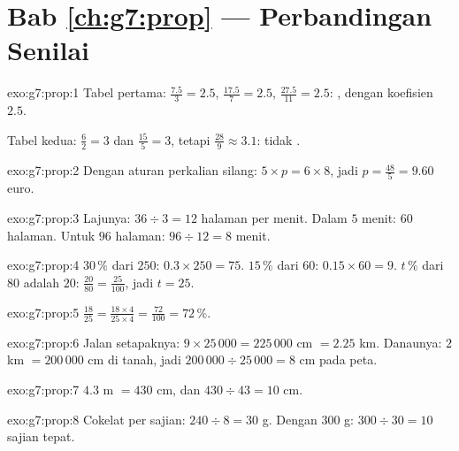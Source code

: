 \section*{Bab \ref{ch:g7:prop} --- Perbandingan Senilai}

\begin{solution}{exo:g7:prop:1}
Tabel pertama:  $\frac{7.5}{3} = 2.5$,
$\frac{17.5}{7} = 2.5$, $\frac{27.5}{11} = 2.5$: , dengan
koefisien $2.5$.

Tabel kedua: $\frac62 = 3$ dan $\frac{15}{5} = 3$, tetapi
$\frac{28}{9} \approx 3.1$: tidak .
\end{solution}

\begin{solution}{exo:g7:prop:2}
Dengan aturan perkalian silang: $5 \times p = 6 \times 8$, jadi
$p = \frac{48}{5} = 9.60$ euro.
\end{solution}

\begin{solution}{exo:g7:prop:3}
Lajunya: $36 \div 3 = 12$ halaman per menit. Dalam $5$ menit:
$60$ halaman. Untuk $96$ halaman: $96 \div 12 = 8$ menit.
\end{solution}

\begin{solution}{exo:g7:prop:4}
$30\,\%$ dari $250$: $0.3 \times 250 = 75$. \quad
$15\,\%$ dari $60$: $0.15 \times 60 = 9$. \quad
$t\,\%$ dari $80$ adalah $20$: $\frac{20}{80} = \frac{25}{100}$, jadi
$t = 25$.
\end{solution}

\begin{solution}{exo:g7:prop:5}
$\frac{18}{25} = \frac{18 \times 4}{25 \times 4} = \frac{72}{100} =
72\,\%$.
\end{solution}

\begin{solution}{exo:g7:prop:6}
Jalan setapaknya: $9 \times 25\,000 = 225\,000$ cm $= 2.25$ km.
Danaunya: $2$ km $= 200\,000$ cm di tanah, jadi
$200\,000 \div 25\,000 = 8$ cm pada peta.
\end{solution}

\begin{solution}{exo:g7:prop:7}
$4.3$ m $= 430$ cm, dan $430 \div 43 = 10$ cm.
\end{solution}

\begin{solution}{exo:g7:prop:8}
Cokelat per sajian: $240 \div 8 = 30$ g. Dengan $300$ g:
$300 \div 30 = 10$ sajian tepat.
\end{solution}

